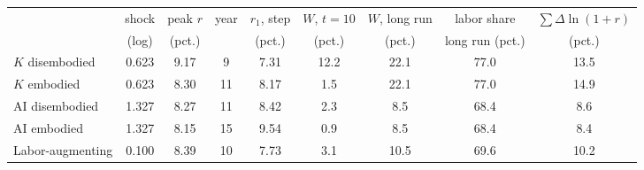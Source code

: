 \begin{tabular}{lcccccccc}\toprule
 & shock & peak $r$ & year & $r_1$, step & $W$, $t{=}10$ & $W$, long run & labor share & $\sum\Delta\ln(1+r)$\\
 & (log) & (pct.) & & (pct.) & (pct.) & (pct.) & long run (pct.) & (pct.)\\\midrule
$K$ disembodied & 0.623 & 9.17 & 9 & 7.31 & 12.2 & 22.1 & 77.0 & 13.5\\
$K$ embodied & 0.623 & 8.30 & 11 & 8.17 & 1.5 & 22.1 & 77.0 & 14.9\\
AI disembodied & 1.327 & 8.27 & 11 & 8.42 & 2.3 & 8.5 & 68.4 & 8.6\\
AI embodied & 1.327 & 8.15 & 15 & 9.54 & 0.9 & 8.5 & 68.4 & 8.4\\
Labor-augmenting & 0.100 & 8.39 & 10 & 7.73 & 3.1 & 10.5 & 69.6 & 10.2\\
\bottomrule\end{tabular}
